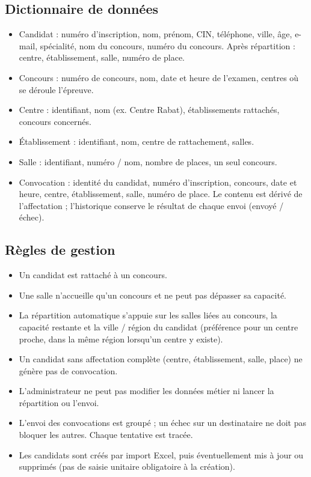 \begin{onehalfspace}
\subsection{Dictionnaire de données}

\begin{itemize}
  \item Candidat : numéro d'inscription, nom, prénom, CIN, téléphone, ville, âge, e-mail, spécialité, nom du concours, numéro du concours. Après répartition : centre, établissement, salle, numéro de place.
  \item Concours : numéro de concours, nom, date et heure de l'examen, centres où se déroule l'épreuve.
  \item Centre : identifiant, nom (ex. Centre Rabat), établissements rattachés, concours concernés.
  \item Établissement : identifiant, nom, centre de rattachement, salles.
  \item Salle : identifiant, numéro / nom, nombre de places, un seul concours.
  \item Convocation : identité du candidat, numéro d'inscription, concours, date et heure, centre, établissement, salle, numéro de place. Le contenu est dérivé de l'affectation ; l'historique conserve le résultat de chaque envoi (envoyé / échec).
\end{itemize}

\subsection{Règles de gestion}

\begin{itemize}
  \item Un candidat est rattaché à un concours.
  \item Une salle n'accueille qu'un concours et ne peut pas dépasser sa capacité.
  \item La répartition automatique s'appuie sur les salles liées au concours, la capacité restante et la ville / région du candidat (préférence pour un centre proche, dans la même région lorsqu'un centre y existe).
  \item Un candidat sans affectation complète (centre, établissement, salle, place) ne génère pas de convocation.
  \item L'administrateur ne peut pas modifier les données métier ni lancer la répartition ou l'envoi.
  \item L'envoi des convocations est groupé ; un échec sur un destinataire ne doit pas bloquer les autres. Chaque tentative est tracée.
  \item Les candidats sont créés par import Excel, puis éventuellement mis à jour ou supprimés (pas de saisie unitaire obligatoire à la création).
\end{itemize}


\end{onehalfspace}
